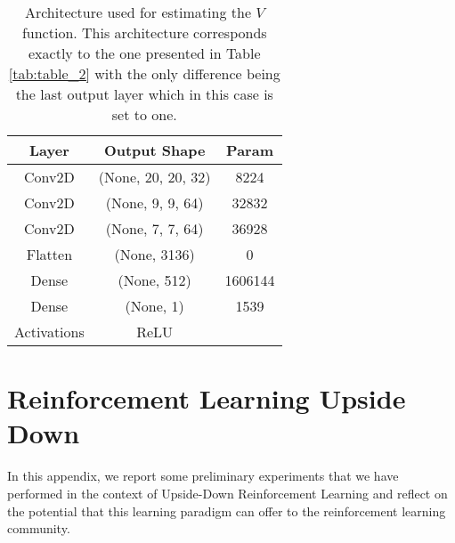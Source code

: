 \begin{table}[ht!]
\centering
\caption{Architecture used for estimating the $V$ function. This architecture corresponds exactly to the one presented in Table \ref{tab:table_2} with the only difference being the last output layer which in this case is set to one.}
\begin{tabular}{c | c | c | }
Layer & Output Shape & Param \\
\hline \hline 
Conv2D & (None, 20, 20, 32) & 8224 \\     
Conv2D & (None, 9, 9, 64) & 32832 \\ 
Conv2D & (None, 7, 7, 64)  & 36928 \\ 
Flatten & (None, 3136) & 0 \\
Dense & (None, 512) & 1606144 \\
Dense & (None, 1) & 1539 \\
Activations & ReLU & \\

\end{tabular}
\label{tab:table_3}
\end{table}





\chapter{Reinforcement Learning Upside Down}\label{ch:appendixupsidedown}

In this appendix, we report some preliminary experiments that we have performed in the context of Upside-Down Reinforcement Learning and reflect on the potential that this learning paradigm can offer to the reinforcement learning community. 

